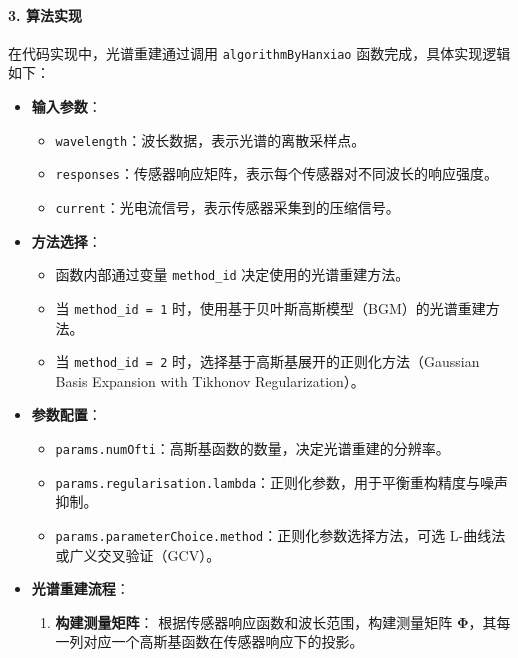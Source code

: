 \documentclass[12pt,hyperref,a4paper,UTF8]{ctexart}
\begin{document}
\paragraph{3. 算法实现}
在代码实现中，光谱重建通过调用 \texttt{algorithmByHanxiao} 函数完成，具体实现逻辑如下：

\begin{itemize}
    \item \textbf{输入参数}：
    \begin{itemize}
        \item \texttt{wavelength}：波长数据，表示光谱的离散采样点。
        \item \texttt{responses}：传感器响应矩阵，表示每个传感器对不同波长的响应强度。
        \item \texttt{current}：光电流信号，表示传感器采集到的压缩信号。
    \end{itemize}

    \item \textbf{方法选择}：
    \begin{itemize}
        \item 函数内部通过变量 \texttt{method\_id} 决定使用的光谱重建方法。
        \item 当 \texttt{method\_id = 1} 时，使用基于贝叶斯高斯模型（BGM）的光谱重建方法。
        \item 当 \texttt{method\_id = 2} 时，选择基于高斯基展开的正则化方法（Gaussian Basis Expansion with Tikhonov Regularization）。
    \end{itemize}

    \item \textbf{参数配置}：
    \begin{itemize}
        \item \texttt{params.numOfti}：高斯基函数的数量，决定光谱重建的分辨率。
        \item \texttt{params.regularisation.lambda}：正则化参数，用于平衡重构精度与噪声抑制。
        \item \texttt{params.parameterChoice.method}：正则化参数选择方法，可选 L-曲线法或广义交叉验证（GCV）。
    \end{itemize}

    \item \textbf{光谱重建流程}：
    \begin{enumerate}
        \item \textbf{构建测量矩阵}：
        根据传感器响应函数和波长范围，构建测量矩阵 \(\mathbf{\Phi}\)，其每一列对应一个高斯基函数在传感器响应下的投影。
        

\end{enumerate}
\end{itemize}
\end{document}

